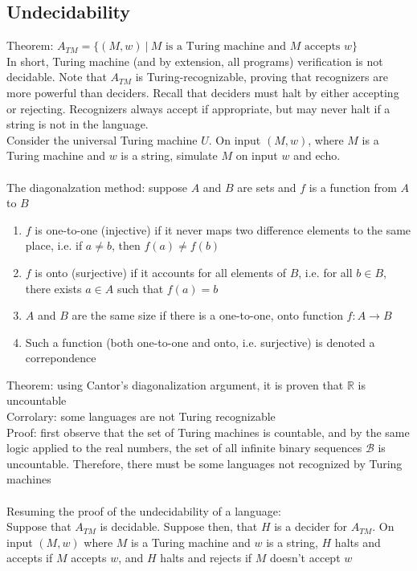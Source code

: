 \documentclass{article}
\newcommand*{\<}{\langle}
\renewcommand*{\>}{\rangle}
\begin{document}
		\subsection{Undecidability}
			Theorem: $A_{TM} = \{(M, w)\:|\:M\text{ is a Turing machine and }M\text{ accepts }w\}$ \\
			In short, Turing machine (and by extension, all programs) verification is not decidable. Note that $A_{TM}$ is Turing-recognizable, proving that recognizers are more powerful than deciders. Recall that deciders must halt by either accepting or rejecting. Recognizers always accept if appropriate, but may never halt if a string is not in the language. \\
			Consider the universal Turing machine $U$. On input $(M, w)$, where $M$ is a Turing machine and $w$ is a string, simulate $M$ on input $w$ and echo. \\
			\\
			The diagonalzation method: suppose $A$ and $B$ are sets and $f$ is a function from $A$ to $B$ 
			\begin{enumerate}
				\item $f$ is one-to-one (injective) if it never maps two difference elements to the same place, i.e. if $a \neq b$, then $f(a) \neq f(b)$ 
				\item $f$ is onto (surjective) if it accounts for all elements of $B$, i.e. for all $b \in B$, there exists $a \in A$ such that $f(a) = b$ 
				\item $A$ and $B$ are the same size if there is a one-to-one, onto function $f: A \to B$ 
				\item Such a function (both one-to-one and onto, i.e. surjective) is denoted a correpondence 
			\end{enumerate}
			Theorem: using Cantor's diagonalization argument, it is proven that $\mathbb{R}$ is uncountable \\
			Corrolary: some languages are not Turing recognizable \\
			Proof: first observe that the set of Turing machines is countable, and by the same logic applied to the real numbers, the set of all infinite binary sequences $\mathcal{B}$ is uncountable. Therefore, there must be some languages not recognized by Turing machines \\
			\\
			Resuming the proof of the undecidability of a language: \\
			Suppose that $A_{TM}$ is decidable. Suppose then, that $H$ is a decider for $A_{TM}$. On input $(M, w)$ where $M$ is a Turing machine and $w$ is a string, $H$ halts and accepts if $M$ accepts $w$, and $H$ halts and rejects if $M$ doesn't accept $w$ \\
\end{document}
